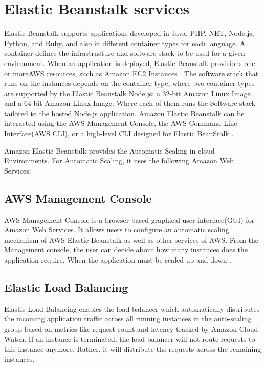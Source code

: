 \documentclass[9pt,twocolumn,twoside]{styles/osajnl}
\begin{document}
\section{Elastic Beanstalk services}

Elastic Beanstalk supports applications developed in Java, PHP, NET,
Node.js, Python, and Ruby, and also in different container types for
each language. A container defines the infrastructure and software
stack to be used for a given environment. When an application is
deployed, Elastic Beanstalk provisions one or moreAWS resources, such
as Amazon EC2 Instances \cite{elastic-beanstalk-book}. The software
stack that runs on the instances depends on the container type, where
two container types are supported by the Elastic Beanstalk Node.js: a
32-bit Amazon Linux Image and a 64-bit Amazon Linux Image. Where each
of them runs the Software stack tailored to the hosted Node.js
application. Amazon Elastic Beanstalk can be interacted using the AWS
Management Console, the AWS Command Line Interface(AWS CLI), or a
high-level CLI designed for Elastic BeanStalk
\cite{elastic-beanstalk-book}.

Amazon Elastic Beanstalk provides the Automatic Scaling in cloud
Environments.  For Automatic Scaling, it uses the following Amazon Web
Services:

\subsection{AWS Management Console}

AWS Management Console is a browser-based graphical user
interface(GUI) for Amazon Web Services. It allows users to configure
an automatic scaling mechanism of AWS Elastic Beanstalk as well as
other services of AWS. From the Management console, the user can decide
about how many instances does the application require. When the
application must be scaled up and down \cite{elastic-beanstalk}.

\subsection{Elastic Load Balancing}

Elastic Load Balancing enables the load balancer which automatically
distributes the incoming application traffic across all running
instances in the auto-scaling group based on metrics like request count
and latency tracked by Amazon Cloud Watch. If an instance is
terminated, the load balancer will not route requests to this instance
anymore. Rather, it will distribute the requests across the remaining
instances.
    
\end{document}

